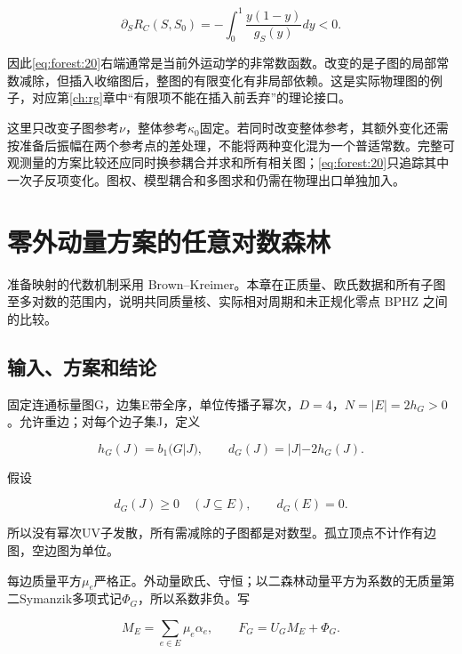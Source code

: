 \documentclass[11pt,a4paper,oneside]{ctexrep}
\theoremstyle{cnplain}
\theoremstyle{definition}
\theoremstyle{remark}
\begin{document}
\begin{equation}
\partial_S R_C(S,S_0)
       =-\int_0^1\frac{y(1-y)}{g_S(y)}dy<0.                    \label{eq:forest:26}
\end{equation}

因此\eqref{eq:forest:20}右端通常是当前外运动学的非常数函数。改变的是子图的局部常数减除，但插入收缩图后，整图的有限变化有非局部依赖。这是实际物理图的例子，对应第\ref{ch:rg}章中``有限项不能在插入前丢弃''的理论接口。

这里只改变子图参考\(\nu \)，整体参考\(\kappa _0\)固定。若同时改变整体参考，其额外变化还需按准备后振幅在两个参考点的差处理，不能将两种变化混为一个普适常数。完整可观测量的方案比较还应同时换参耦合并求和所有相关图；\eqref{eq:forest:20}只追踪其中一次子反项变化。图权、模型耦合和多图求和仍需在物理出口单独加入。


\chapter{零外动量方案的任意对数森林}\label{ch:zero}
准备映射的代数机制采用 Brown--Kreimer\cite{bk2011}。本章在正质量、欧氏数据和所有子图至多对数的范围内，说明共同质量核、实际相对周期和未正规化零点 BPHZ 之间的比较。
\section{输入、方案和结论}\label{sec:zero:1}

固定连通标量图G，边集E带全序，单位传播子幂次，\(D=4\)，\(N=|E|=2h_G>0\)。允许重边；对每个边子集J，定义

\begin{equation}
h_G(J)=b_1(G|J),\qquad d_G(J)=|J|-2h_G(J).
\end{equation}

假设

\begin{equation}
d_G(J)\geq0\quad(J\subseteq E),\qquad d_G(E)=0.       \label{eq:zero:1}
\end{equation}

所以没有幂次UV子发散，所有需减除的子图都是对数型。孤立顶点不计作有边图，空边图为单位。

每边质量平方\(\mu _e\)严格正。外动量欧氏、守恒；以二森林动量平方为系数的无质量第二Symanzik多项式记\(\Phi _G\)，所以系数非负。写

\begin{equation}
M_E=\sum_{e\in E}\mu_e\alpha_e,\qquad F_G=U_GM_E+\Phi_G.
\end{equation}
\end{document}
